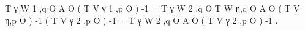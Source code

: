 T γ W 1 ,q O A O ( T V γ 1 ,p O ) -1 = T γ W 2 ,q O T W η,q O A O ( T V η,p O ) -1 ( T V γ 2 ,p O ) -1 = T γ W 2 ,q O A O ( T V γ 2 ,p O ) -1 .
